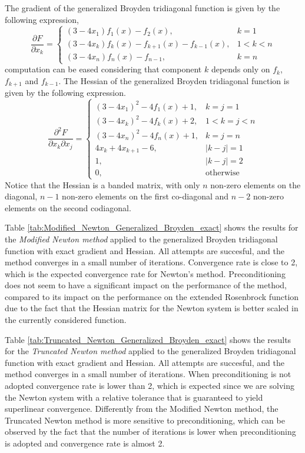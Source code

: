 The gradient of the generalized Broyden tridiagonal function is given by the following expression,
\begin{equation}
    \frac{\partial F}{\partial x_k} = \left \{ \begin{array}{ll}
    (3 - 4x_1)f_1(x) - f_2(x), & k = 1\\
    (3-4x_k)f_k(x) - f_{k+1}(x) - f_{k-1}(x), & 1 < k < n\\
    (3-4x_n)f_n(x) - f_{n-1}, & k = n
    \end{array} \right .
\end{equation}
computation can be eased considering that component $k$ depends only on $f_k$, $f_{k+1}$ and $f_{k-1}$.
The Hessian of the generalized Broyden tridiagonal function is given by the following expression.
\begin{equation}
    \frac{\partial^2 F}{\partial x_k \partial x_j} = \left \{ \begin{array}{ll}
    (3-4x_1)^2 - 4f_1(x) + 1, & k = j = 1 \\
    (3-4x_k)^2 - 4f_k(x) + 2, & 1 < k = j < n\\
    (3-4x_n)^2 - 4f_n(x) + 1, & k = j = n \\
    4x_k + 4x_{k+1} - 6, & |k-j| = 1\\
    1, & |k-j| = 2\\
    0, & \text{otherwise}
    \end{array} \right .
\end{equation}
Notice that the Hessian is a banded matrix, with only $n$ non-zero elements on the diagonal, $n-1$ non-zero elements on the first co-diagonal and $n-2$ non-zero elements on the second codiagonal.

Table \ref{tab:Modified_Newton_Generalized_Broyden_exact} shows the results for the \textit{Modified Newton method} applied to the generalized Broyden tridiagonal function with exact gradient and Hessian.
All attempts are succesful, and the method converges in a small number of iterations.
Convergence rate is close to 2, which is the expected convergence rate for Newton's method.
Preconditioning does not seem to have a significant impact on the performance of the method, compared to its impact on the performance on the extended Rosenbrock function due to the fact that the Hessian matrix for the Newton system is better scaled in the currently considered function.

Table \ref{tab:Truncated_Newton_Generalized_Broyden_exact} shows the results for the \textit{Truncated Newton method} applied to the generalized Broyden tridiagonal function with exact gradient and Hessian.
All attempts are succesful, and the method converges in a small number of iterations.
When preconditioning is not adopted convergence rate is lower than 2, which is expected since we are solving the Newton system with a relative tolerance that is guaranteed to yield superlinear convergence.
Differently from the Modified Newton method, the Truncated Newton method is more sensitive to preconditioning, which can be observed by the fact that the number of iterations is lower when preconditioning is adopted and convergence rate is almost 2.

